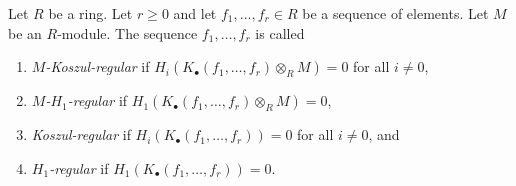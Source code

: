 \begin{definition}
\label{definition-koszul-regular-sequence}
Let $R$ be a ring. Let $r \geq 0$ and let $f_1, \ldots, f_r \in R$
be a sequence of elements. Let $M$ be an $R$-module.
The sequence $f_1, \ldots, f_r$ is called
\begin{enumerate}
\item {\it $M$-Koszul-regular} if
$H_i(K_\bullet(f_1, \ldots, f_r) \otimes_R M) = 0$ for
all $i \not = 0$,
\item {\it $M$-$H_1$-regular} if
$H_1(K_\bullet(f_1, \ldots, f_r) \otimes_R M) = 0$,
\item {\it Koszul-regular} if $H_i(K_\bullet(f_1, \ldots, f_r)) = 0$ for
all $i \not = 0$, and
\item {\it $H_1$-regular} if $H_1(K_\bullet(f_1, \ldots, f_r)) = 0$.
\end{enumerate}
\end{definition}